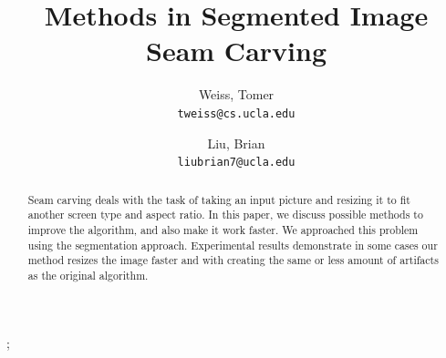 \documentclass[conference]{acmsiggraph}
\title{Methods in Segmented Image Seam Carving}
\author{
  Weiss, Tomer\\
  \texttt{tweiss@cs.ucla.edu}
  \and
  Liu, Brian\\
  \texttt{liubrian7@ucla.edu}
}
\begin{document}

\maketitle

\begin{abstract}

\paragraph{}
Seam carving deals with the task of taking an input picture and resizing it to fit another screen type and aspect ratio. In this paper, we discuss possible methods to improve the algorithm, and also make it work faster. We approached this problem using the segmentation approach. Experimental results demonstrate in some cases our method resizes the image faster and with creating the same or less amount of artifacts as the original algorithm.




\end{abstract}

\begin{CRcatlist}  

  
  ;     
  
\end{CRcatlist}

\keywordlist


\TOGlinkslist
\end{document}
